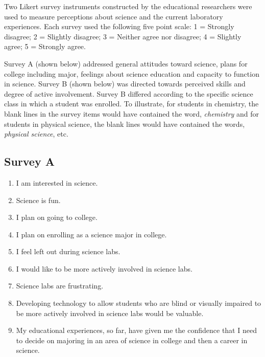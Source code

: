 \documentclass[11.5pt]{sig-alternate} %
\begin{document}
\begin{large}
Two Likert survey instruments constructed by the educational researchers were used to measure perceptions about science and the current laboratory experiences. Each  survey used the following five point scale: 1 = Strongly disagree; 2 = Slightly disagree; 3 = Neither agree nor disagree; 4 = Slightly agree; 5 = Strongly agree. 

Survey A (shown below) addressed general attitudes toward science, plans for college including major, feelings about science education and capacity to function in science. Survey B (shown below) was directed towards perceived skills and degree of active involvement. Survey B differed according to the specific science class in which a student was enrolled. To illustrate, for students in chemistry, the blank lines in the survey items would have contained the word, \textit{chemistry} and for students in physical science, the blank lines would have contained the words, \textit{physical science}, etc. 

\subsection*{Survey A}
\begin{enumerate}
    \item  I am interested in science.
    \item  Science is fun.
    \item  I plan on going to college.
    \item  I plan on enrolling as a science major in college.
    \item  I feel left out during science labs.
    \item  I would like to be more actively involved in science labs.
    \item Science labs are frustrating.
    \item  Developing technology to allow students who are blind or visually impaired to be more actively involved in science labs would be valuable.
    \item  My educational experiences, so far, have given me the confidence that I need to decide on majoring in an area of science in college and then a career in science.
\end{enumerate}
                                                             

\end{large}
\end{document}
